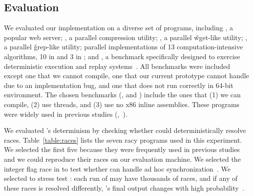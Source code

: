 \subsection{Evaluation} \label{sec:peregrine-eval}
We evaluated our \peregrine implementation on a diverse set of \nprog programs,
including \apache, a popular web server; \pbzip, a parallel compression
utility; \aget, a parallel \v{wget}-like utility; \pfscan, a parallel
\v{grep}-like utility; parallel implementations of 13
computation-intensive algorithms, 10 in \splash and 3 in \parsec; and
\racey, a benchmark specifically designed to exercise deterministic
execution and replay systems~\cite{racy-stress}.  All \splash benchmarks
were included except one that we cannot compile, one that our current prototype
cannot handle due to an implementation bug, and one that does not run
correctly in 64-bit environment.  The chosen \parsec benchmarks
(\blackscholes, \swaptions and \streamcluster) include the ones that (1)
we can compile, (2) use threads, and (3) use no x86 inline assemblies.
These programs were widely used in previous studies
(\eg,~\cite{lu:concurrency-bugs,syncfinder:osdi10,grace:oopsla09}).

We evaluated \peregrine's determinism by checking whether \peregrine could
deterministically resolve races.  Table~\ref{table:races} lists the seven
racy programs used in this experiment.  We selected the first five because
they were frequently used in previous
studies~\cite{avio:asplos06,ctrigger:asplos09,lu:concurrency-bugs,pres:sosp09}
and we could reproduce their races on our evaluation machine.  We selected the
integer flag race in \parsec to test whether \peregrine can handle ad hoc
synchronization~\cite{syncfinder:osdi10}.  We selected \racey to stress
test \peregrine: each run of \racey may have thousands of races, and if any of
these races is resolved differently, \racey's final output changes
with high probability~\cite{racy-stress}.

